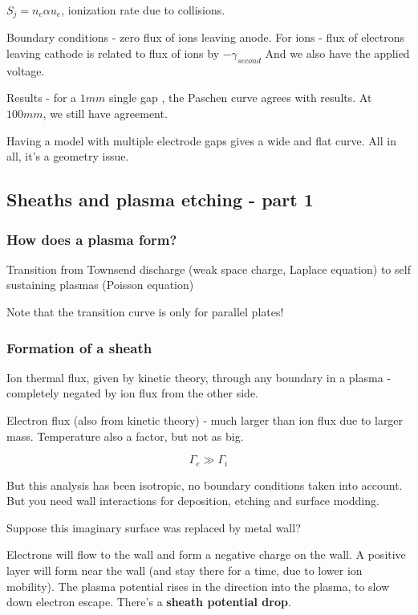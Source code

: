 \documentclass[PlasmaNotes.tex]{subfiles}
\begin{document}
$S_j = n_e \alpha u_e$, ionization rate due to collisions.

Boundary conditions - zero flux of ions leaving anode. For ions - flux of electrons leaving cathode is related to flux of ions by $-\gamma_{second}$ And we also have the applied voltage.

Results - for a $1mm$ single gap , the Paschen curve agrees with results. At $100mm$, we still have agreement.

Having a model with multiple electrode gaps gives a wide and flat curve. All in all, it's a geometry issue.

\subsection{Sheaths and plasma etching - part 1}

\subsubsection{How does a plasma form?}

Transition from Townsend discharge (weak space charge, Laplace equation) to self sustaining plasmas (Poisson equation)

Note that the transition curve is only for parallel plates!

\subsubsection{Formation of a sheath}

Ion thermal flux, given by kinetic theory, through any boundary in a plasma - completely negated by ion flux from the other side.

Electron flux (also from kinetic theory) - much larger than ion flux due to larger mass. Temperature also a factor, but not as big.

\[\Gamma_e \gg \Gamma_i\]

But this analysis has been isotropic, no boundary conditions taken into account. But you need wall interactions for deposition, etching and surface modding.

Suppose this imaginary surface was replaced by metal wall?

Electrons will flow to the wall and form a negative charge on the wall. A positive layer will form near the wall (and stay there for a time, due to lower ion mobility). The plasma potential rises in the direction into the plasma, to slow down electron escape. There's a \textbf{sheath potential drop}.
\end{document}
